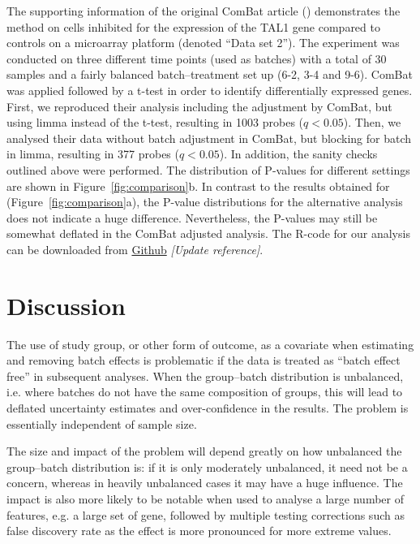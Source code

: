 \documentclass{bio}
\newcommand\NB[1]{\textcolor{NBcol}{\textit{#1}}}
\newcommand\NOTE[1]{\NB{[#1]}}
\begin{document}
The supporting information of the original ComBat article (\citealp{Johnson2007}) demonstrates the method on cells inhibited for the expression of the TAL1 gene compared to controls on a microarray platform (denoted ``Data set 2''). The experiment was conducted on three different time points (used as batches) with a total of 30 samples and a fairly balanced batch--treatment set up (6-2, 3-4 and 9-6). ComBat was applied followed by a t-test in order to identify differentially expressed genes. First, we reproduced their analysis including the adjustment by ComBat, but using limma instead of the t-test, resulting in 1003 probes ($q<0.05$).  Then, we analysed their data without batch adjustment in ComBat, but blocking for batch in limma, resulting in 377 probes ($q<0.05$). In addition, the sanity checks outlined above were performed. The distribution of P-values for different settings are shown in Figure~\ref{fig:comparison}b. In contrast to the results obtained for \citet{Towfic2014} (Figure~\ref{fig:comparison}a), the P-value distributions for the alternative analysis does not indicate a huge difference. Nevertheless, the P-values may still be somewhat deflated in the ComBat adjusted analysis. The R-code for our analysis can be downloaded from \href{https://github.com/vegardny/combat_tests.git}{Github} \NOTE{Update reference}.


\section{Discussion}

The use of study group, or other form of outcome, as a covariate when estimating and removing batch effects is problematic if the data is treated as ``batch effect free'' in subsequent analyses. When the group--batch distribution is unbalanced, i.e. where batches do not have the same composition of groups, this will lead to deflated uncertainty estimates and over-confidence in the results. The problem is essentially independent of sample size.

The size and impact of the problem will depend greatly on how unbalanced the group--batch distribution is: if it is only moderately unbalanced, it need not be a concern, whereas in heavily unbalanced cases it may have a huge influence. The impact is also more likely to be notable when used to analyse a large number of features, e.g. a large set of gene, followed by multiple testing corrections such as false discovery rate as the effect is more pronounced for more extreme values.
\end{document}
